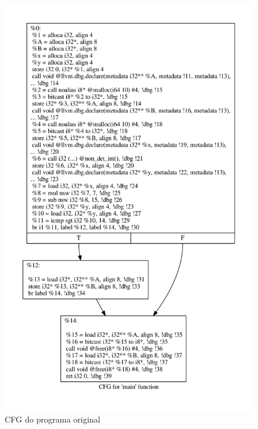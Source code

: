 \begin{figure}[H]
	\caption{\label{fig:vanilla_cfg} CFG do programa original}
	\begin{center}
	    \includegraphics[scale=0.6]{resources/vanilla_cfg.pdf}
	\end{center}
\end{figure}

